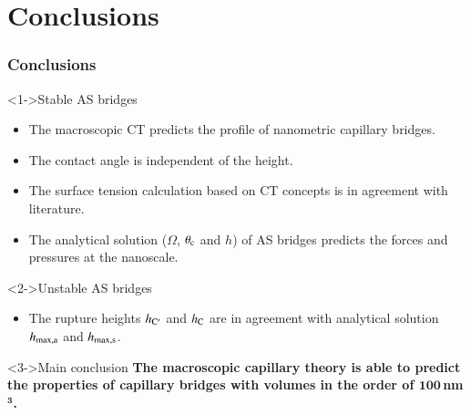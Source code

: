 \documentclass[8pt]{beamer}
\begin{document}
\section{Conclusions}
\begin{frame}
\frametitle{Conclusions}
	\vspace{-0.3cm}
	\begin{block}<1->{Stable AS bridges}
 		\begin{itemize}
			\item The macroscopic CT predicts the profile of nanometric capillary bridges.
			\item The contact angle is independent of the height.
			\item The surface tension calculation based on CT concepts is in agreement with literature. 
			\item The analytical solution ($\Omega$, $\theta_{\rm c}$ and $h$) of AS bridges predicts the forces and pressures at the nanoscale.			
		\end{itemize}
	\end{block}
	\begin{block}<2->{Unstable AS bridges}
 		\begin{itemize}
			\item The rupture heights $h_{\rm C'}$ and $h_{\rm C}$ are in agreement with analytical solution $h_{\rm max,a}$ and $h_{\rm max,s}$.			
		\end{itemize}
	\end{block}	
 	\begin{block}<3->{Main conclusion}
	\textbf{The macroscopic capillary theory is able to predict the properties of capillary bridges with volumes in the order of  $\mathbf{100}$\,nm$\boldsymbol{^3}$.}
 	\end{block}

\end{frame}
\end{document}
